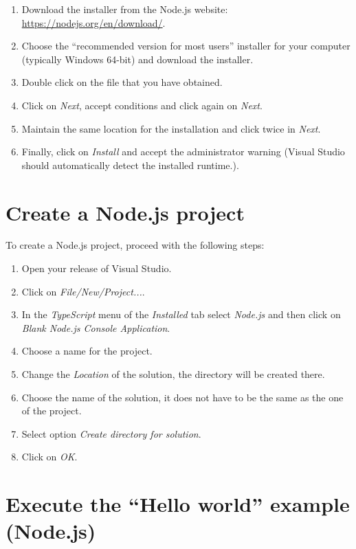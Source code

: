 \begin{enumerate}
    \item Download the installer from the Node.js website: \url{https://nodejs.org/en/download/}.
    \item Choose the ``recommended version for most users'' installer for your computer (typically Windows 64-bit) and download the installer.
    \item Double click on the file that you have obtained.
    \item Click on \textit{Next}, accept conditions and click again on \textit{Next}.
    \item Maintain the same location for the installation and click twice in \textit{Next}.
    \item Finally, click on \textit{Install} and accept the administrator warning (Visual Studio should automatically detect the installed runtime.).
\end{enumerate}



    \FloatBarrier
    \section{Create a Node.js project}

To create a Node.js project, proceed with the following steps: 

\begin{enumerate}
    \item Open your release of Visual Studio.
    \item Click on \textit{File/New/Project...}.
    \item In the \textit{TypeScript} menu of the \textit{Installed} tab select \textit{Node.js} and then click on \textit{Blank Node.js Console Application}.
    \item Choose a name for the project. 
    \item Change the \textit{Location} of the solution, the directory will be created there.
    \item Choose the name of the solution, it does not have to be the same as the one of the project.  
    \item Select option \textit{Create directory for solution}.
    \item Click on \textit{OK}.
\end{enumerate}




    \FloatBarrier
    \section{Execute the ``Hello world'' example (Node.js)} 
    
